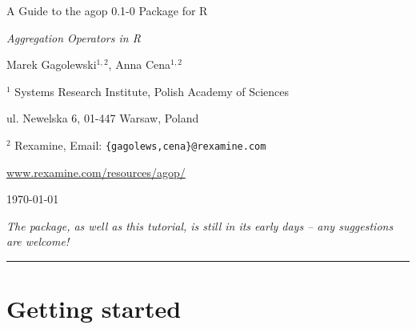 \documentclass[11pt]{article}\usepackage{graphicx, color}
\newcommand{\hlnumber}[1]{\textcolor[rgb]{0,0,0}{#1}}%
\newcommand{\hlfunctioncall}[1]{\textcolor[rgb]{0.501960784313725,0,0.329411764705882}{\textbf{#1}}}%
\newcommand{\hlstring}[1]{\textcolor[rgb]{0.6,0.6,1}{#1}}%
\newcommand{\hlkeyword}[1]{\textcolor[rgb]{0,0,0}{\textbf{#1}}}%
\newcommand{\hlargument}[1]{\textcolor[rgb]{0.690196078431373,0.250980392156863,0.0196078431372549}{#1}}%
\newcommand{\hlcomment}[1]{\textcolor[rgb]{0.180392156862745,0.6,0.341176470588235}{#1}}%
\newcommand{\hlroxygencomment}[1]{\textcolor[rgb]{0.43921568627451,0.47843137254902,0.701960784313725}{#1}}%
\newcommand{\hlformalargs}[1]{\textcolor[rgb]{0.690196078431373,0.250980392156863,0.0196078431372549}{#1}}%
\newcommand{\hleqformalargs}[1]{\textcolor[rgb]{0.690196078431373,0.250980392156863,0.0196078431372549}{#1}}%
\newcommand{\hlassignement}[1]{\textcolor[rgb]{0,0,0}{\textbf{#1}}}%
\newcommand{\hlpackage}[1]{\textcolor[rgb]{0.588235294117647,0.709803921568627,0.145098039215686}{#1}}%
\newcommand{\hlslot}[1]{\textit{#1}}%
\newcommand{\hlsymbol}[1]{\textcolor[rgb]{0,0,0}{#1}}%
\newcommand{\hlprompt}[1]{\textcolor[rgb]{0.2,0.2,0.2}{#1}}%
\newcommand{\package}[1]{\textsf{#1}\xspace}
\newcommand{\lang}[1]{\textsf{#1}\xspace}
\newcommand{\R}{\lang{R}}
\theoremstyle{remark}
\theoremstyle{definition}
\begin{document}
\begin{center}
{\LARGE\sf A Guide to the \package{agop} {0.1-0} Package for \R}

{\large\sf\textit{Aggregation Operators in \R}}

\bigskip
{\large Marek Gagolewski${}^{1,2}$, Anna Cena${}^{1,2}$}

${}^{1}$ Systems Research Institute, Polish Academy of Sciences

ul. Newelska 6, 01-447 Warsaw, Poland

${}^{2}$ Rexamine, Email: \texttt{\{gagolews,cena\}@rexamine.com}

\href{http://www.rexamine.com/resources/agop/}%
{www.rexamine.com/resources/agop/}

\bigskip
\today


\medskip
\textit{The package, as well as this tutorial, is still in its early
days -- any suggestions are welcome!}
\end{center}





\bigskip\hrule\bigskip
\tableofcontents









\section{Getting started}
\end{document}
